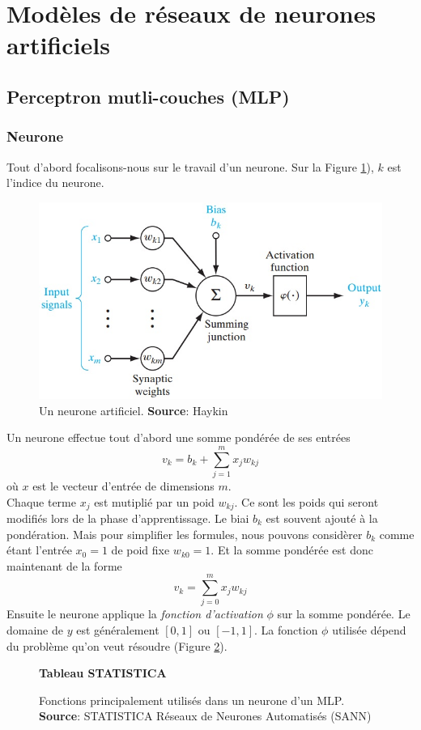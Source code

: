 \documentclass[12pt,a4paper,oneside, titlepage]{article}
\begin{document}
\section{Modèles de réseaux de neurones artificiels}
\terminologie
\subsection{Perceptron mutli-couches (MLP)}
\subsubsection*{Neurone}
Tout d'abord focalisons-nous sur le travail d'un neurone.
Sur la Figure \ref{neuronemlp}), $k$ est l'indice du neurone.
\begin{figure}
 \centering
 \includegraphics[scale=0.5]{../figures/neurone.jpg}
 \caption{Un neurone artificiel. \textbf{Source}: Haykin\cite{Haykin}}
 \label{neuronemlp}
\end{figure}
Un neurone effectue tout d'abord une somme pondérée de ses entrées \[v_k = b_k+\sum_{j=1}^{m}x_{j}w_{kj}\] où $x$ est le vecteur d'entrée de dimensions $m$.\\
Chaque terme $x_j$ est mutiplié par un poid $w_{kj}$. Ce sont les poids qui seront modifiés lors de la phase d'apprentissage.
Le biai $b_k$ est souvent ajouté à la pondération. Mais pour simplifier les formules, nous pouvons considèrer $b_k$ comme étant l'entrée $x_0 = 1$ de poid fixe $w_{k0} = 1$.
Et la somme pondérée est donc maintenant de la forme \[v_k = \sum_{j=0}^{m}x_{j}w_{kj}\]
Ensuite le neurone applique la \emph{fonction d'activation} $\phi$ sur la somme pondérée.
Le domaine de $y$ est généralement $[0,1]$ ou $[-1,1]$.\cite{Haykin}
La fonction $\phi$ utilisée dépend du problème qu'on veut résoudre (Figure \ref{mlpfonc}).
\begin{figure}
 \centering
 \textbf{Tableau STATISTICA}
 \caption{Fonctions principalement utilisés dans un neurone d'un MLP. \textbf{Source}: STATISTICA Réseaux de Neurones Automatisés (SANN)\cite{statistica}}
 \label{mlpfonc}
\end{figure}
\end{document}
